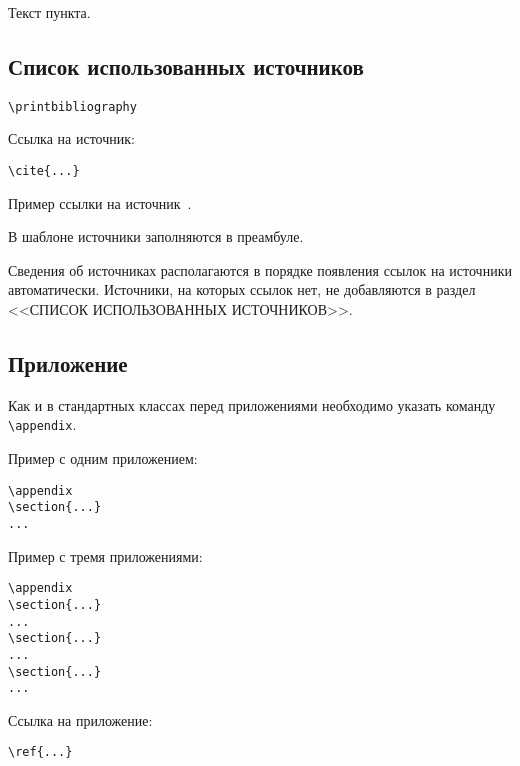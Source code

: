 \documentclass[14pt, a4paper, titlepage]{extarticle}
\renewcommand{\thesection}{\Asbuk{section}}
\let\oldsec\section
\renewcommand{\section}{
        \clearpage
        \phantomsection
        \refstepcounter{section}
        \addcontentsline{toc}{section}{\appendixname~\thesection}
        \oldsec*} %
\let\oldprintbibliography\printbibliography
\renewcommand{\printbibliography}{\oldprintbibliography[title={Список использованных источников}]}
\begin{document}
Текст пункта.

\subsection{Список использованных источников}

\begin{verbatim}
\printbibliography
\end{verbatim}

Ссылка на источник:
\begin{verbatim}
\cite{...}
\end{verbatim}

Пример ссылки на источник~\cite{bib:recomendations}.

В шаблоне источники заполняются в преамбуле.

Сведения об источниках располагаются в порядке появления ссылок на источники автоматически. Источники, на которых ссылок нет, не добавляются в раздел \uppercase{<<Список использованных источников>>}.

\subsection{Приложение}

Как и в стандартных классах перед приложениями необходимо указать команду \verb"\appendix".

Пример с одним приложением:
\begin{verbatim}
\appendix
\section{...}
...
\end{verbatim}

Пример с тремя приложениями:
\begin{verbatim}
\appendix
\section{...}
...
\section{...}
...
\section{...}
...
\end{verbatim}

Ссылка на приложение:
\begin{verbatim}
\ref{...}
\end{verbatim}
\end{document}
